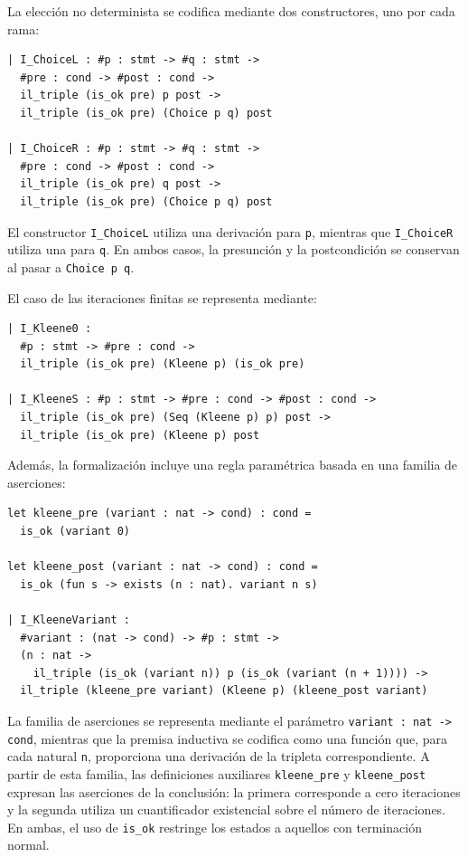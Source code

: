 \documentclass[a4paper,	11pt]{report}
\newif\ifdraft\drafttrue
\newcommand{\comm}[3]{\ifdraft{{\color{#1}[#2: #3]}}\fi}
\newcommand{\guido}[1]{\comm{blue}{Guido}{#1}}
\begin{document}
La elección no determinista se codifica mediante dos constructores,
uno por cada rama:

\begin{lstlisting}
| I_ChoiceL : #p : stmt -> #q : stmt ->
  #pre : cond -> #post : cond ->
  il_triple (is_ok pre) p post ->
  il_triple (is_ok pre) (Choice p q) post

| I_ChoiceR : #p : stmt -> #q : stmt ->
  #pre : cond -> #post : cond ->
  il_triple (is_ok pre) q post ->
  il_triple (is_ok pre) (Choice p q) post
\end{lstlisting}
El constructor \lstinline|I_ChoiceL| utiliza una derivación para \lstinline|p|,
mientras que \lstinline|I_ChoiceR| utiliza una para \lstinline|q|.
En ambos casos,
la presunción y la postcondición se conservan al pasar a \lstinline|Choice p q|.

El caso de las iteraciones finitas se representa mediante:

\begin{lstlisting}
| I_Kleene0 :
  #p : stmt -> #pre : cond ->
  il_triple (is_ok pre) (Kleene p) (is_ok pre)

| I_KleeneS : #p : stmt -> #pre : cond -> #post : cond ->
  il_triple (is_ok pre) (Seq (Kleene p) p) post ->
  il_triple (is_ok pre) (Kleene p) post
\end{lstlisting}

Además,
la formalización incluye una regla paramétrica basada en una familia de aserciones:

\begin{lstlisting}
let kleene_pre (variant : nat -> cond) : cond =
  is_ok (variant 0)

let kleene_post (variant : nat -> cond) : cond =
  is_ok (fun s -> exists (n : nat). variant n s)

| I_KleeneVariant :
  #variant : (nat -> cond) -> #p : stmt ->
  (n : nat ->
    il_triple (is_ok (variant n)) p (is_ok (variant (n + 1)))) ->
  il_triple (kleene_pre variant) (Kleene p) (kleene_post variant)
\end{lstlisting}

La familia de aserciones se representa mediante el parámetro \lstinline|variant : nat -> cond|,
mientras que la premisa inductiva se codifica como una función que,
para cada natural \lstinline|n|,
proporciona una derivación de la tripleta correspondiente.
A partir de esta familia,
las definiciones auxiliares \lstinline|kleene_pre| y \lstinline|kleene_post| expresan las aserciones de la conclusión:
la primera corresponde a cero iteraciones y la segunda utiliza un cuantificador existencial sobre el número de iteraciones.
En ambas,
el uso de \lstinline|is_ok| restringe los estados a aquellos con terminación normal.
\end{document}
